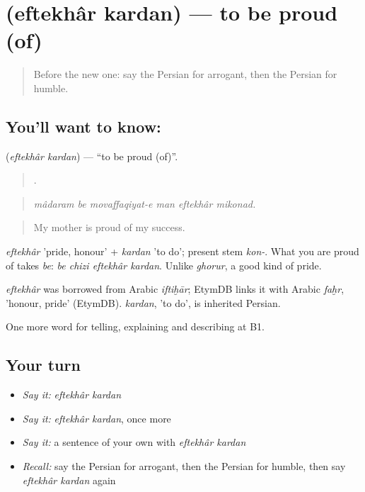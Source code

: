 \section[\texorpdfstring{\fa{افتخار} \fa{کردن} (eftekhâr kardan)}{افتخار کردن (eftekhâr kardan)}]{  (eftekhâr kardan) — to be proud (of)}

\label{lesson:FA-C480-eftekhar-kardan}



\begin{quote}
Before the new one: say the Persian for arrogant, then the Persian for humble.
\end{quote}

\subsection*{You'll want to know:  }
\textbf{ } (\emph{eftekhâr kardan}) — \textquotedblleft{}to be proud (of)\textquotedblright{}.

\begin{quote}
     .
\end{quote}

\begin{quote}
\emph{mâdaram be movaffaqiyat-e man eftekhâr mikonad.}
\end{quote}

\begin{quote}
My mother is proud of my success.
\end{quote}

\emph{eftekhâr} 'pride, honour' + \emph{kardan} 'to do'; present stem \emph{kon-}. What you are proud of takes \emph{be}: \emph{be chizi eftekhâr kardan}. Unlike \emph{ghorur}, a good kind of pride.

\begin{cousinweb}
\emph{eftekhâr} was borrowed from Arabic \emph{iftiḫār}; EtymDB links it with Arabic \emph{faḫr}, 'honour, pride' (EtymDB). \emph{kardan}, 'to do', is inherited Persian.
\end{cousinweb}

\begin{grammarlens}[title={What you've built}]
One more word for telling, explaining and describing at B1.
\end{grammarlens}

\subsection*{Your turn}
\begin{itemize}
\raggedright
  \item \emph{Say it:} \emph{eftekhâr kardan}
  \item \emph{Say it:} \emph{eftekhâr kardan}, once more
  \item \emph{Say it:} a sentence of your own with \emph{eftekhâr kardan}
  \item \emph{Recall:} say the Persian for arrogant, then the Persian for humble, then say \emph{eftekhâr kardan} again
\end{itemize}

